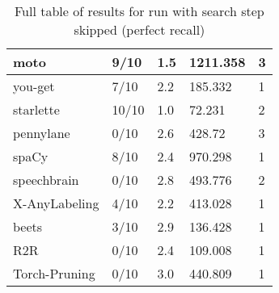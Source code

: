 \documentclass[conference]{IEEEtran}
\begin{document}
\begin{table}[!h]
\begin{tabular}{|l|l|l|l|l|}
        moto & 9/10 & 1.5 & 1211.358 & 3 \\ \hline
        you-get & 7/10 & 2.2 & 185.332 & 1 \\ \hline
        starlette & 10/10 & 1.0 & 72.231 & 2 \\ \hline
        pennylane & 0/10 & 2.6 & 428.72 & 3 \\ \hline
        spaCy & 8/10 & 2.4 & 970.298 & 1 \\ \hline
        speechbrain & 0/10 & 2.8 & 493.776 & 2 \\ \hline
        X-AnyLabeling & 4/10 & 2.2 & 413.028 & 1 \\ \hline
        beets & 3/10 & 2.9 & 136.428 & 1 \\ \hline
        R2R & 0/10 & 2.4 & 109.008 & 1 \\ \hline
        Torch-Pruning & 0/10 & 3.0 & 440.809 & 1 \\ \hline
    \end{tabular}
    \caption{Full table of results for run with search step skipped (perfect recall)}
    \label{tab:results}
\end{table}
\end{document}
